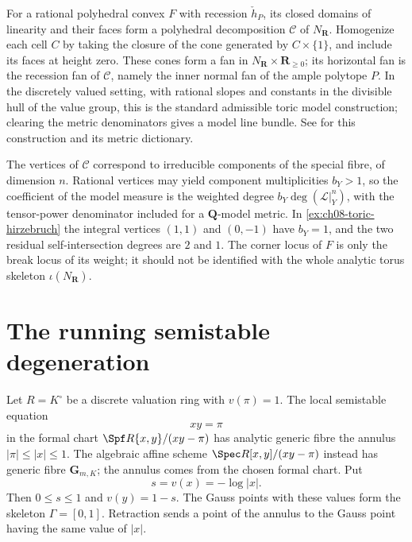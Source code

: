 \begin{remark}
\label{rem:ch08-toric-model}
For a rational polyhedral convex $F$ with recession $\check h_P$, its
closed domains of linearity and their faces form a polyhedral decomposition
$\mathcal C$ of $N_{\mathbf R}$.  Homogenize each cell $C$ by taking the
closure of the cone generated by $C\times\{1\}$, and include its faces at
height zero.  These cones form a fan in
$N_{\mathbf R}\times\mathbf R_{\geq0}$; its horizontal fan is the recession
fan of $\mathcal C$, namely the inner normal fan of the ample polytope $P$.
In the discretely valued setting, with rational slopes and constants in the
divisible hull of the value group, this is the standard admissible toric
model construction; clearing the metric denominators gives a model line
bundle.  See \cite{BGPS14} for this construction and its metric dictionary.

The vertices of $\mathcal C$ correspond to irreducible components of the
special fibre, of dimension $n$.  Rational vertices may yield component
multiplicities $b_Y>1$, so the coefficient of the model measure is the
weighted degree $b_Y\deg(\mathcal L|_Y^n)$, with the tensor-power denominator
included for a $\mathbf Q$-model metric.  In
\cref{ex:ch08-toric-hirzebruch} the integral vertices $(1,1)$ and $(0,-1)$
have $b_Y=1$, and the two residual self-intersection degrees are $2$ and $1$.
The corner locus of $F$ is only the break locus of its weight; it should
not be identified with the whole analytic torus skeleton $\iota(N_{\mathbf R})$.
\end{remark}

\section{The running semistable degeneration}
\label{sec:running-semistable}

Let $R=K^\circ$ be a discrete valuation ring with $v(\pi)=1$.  The local
semistable equation
\begin{equation}
\label{eq:running-node}
                              xy=\pi
\end{equation}
in the formal chart $\Spf R\{x,y\}/(xy-\pi)$ has analytic generic
fibre the annulus $|\pi|\leq|x|\leq1$.  The algebraic affine scheme
$\Spec R[x,y]/(xy-\pi)$ instead has generic fibre $\mathbf G_{m,K}$;
the annulus comes from the chosen formal chart.  Put
\[
                   s=v(x)=-\log|x|.
\]
Then $0\leq s\leq1$ and $v(y)=1-s$.  The Gauss points with these values form
the skeleton $\Gamma=[0,1]$.  Retraction sends a point of the annulus to the
Gauss point having the same value of $|x|$.

